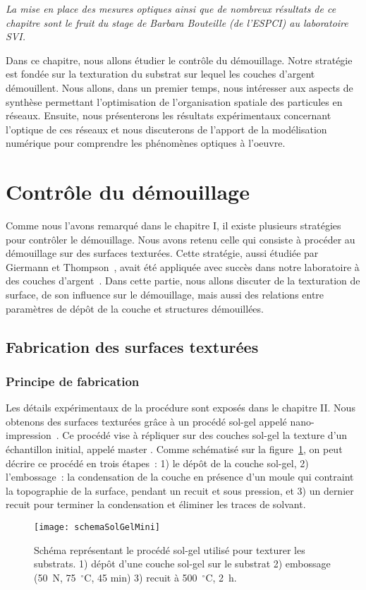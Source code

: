 \newpage\null\thispagestyle{empty}\newpage
\minitoc
\newpage

\textit{La mise en place des mesures optiques ainsi que de nombreux résultats de ce chapitre sont le fruit du stage de Barbara Bouteille (de l'ESPCI) au laboratoire SVI.}\par 
Dans ce chapitre, nous allons étudier le contrôle du démouillage. Notre stratégie est fondée sur la texturation du substrat sur lequel les couches d'argent démouillent. Nous allons, dans un premier temps, nous intéresser aux aspects de synthèse permettant l'optimisation de l'organisation spatiale des particules en réseaux. Ensuite, nous présenterons les résultats expérimentaux concernant l'optique de ces réseaux et nous discuterons de l'apport de la modélisation numérique pour comprendre les phénomènes optiques à l'oeuvre.

\section{Contrôle du démouillage}
Comme nous l'avons remarqué dans le chapitre I, il existe plusieurs stratégies pour contrôler le démouillage. Nous avons retenu celle qui consiste à procéder au démouillage sur des surfaces texturées. Cette stratégie, aussi étudiée par Giermann et Thompson~\cite{giermann2005solid, giermann2011requirements}, avait été appliquée avec succès dans notre laboratoire à des couches d'argent~\cite{le2014self}. Dans cette partie, nous allons discuter de la texturation de surface, de son influence sur le démouillage, mais aussi des relations entre paramètres de dépôt de la couche et structures démouillées.\par 

	\subsection{Fabrication des surfaces texturées}
	\subsubsection{Principe de fabrication}
Les détails expérimentaux de la procédure sont exposés dans le chapitre II. Nous obtenons des surfaces texturées grâce à un procédé sol-gel appelé nano-impression~\cite{le2014self,chou1996nanoimprint}. Ce procédé vise à répliquer sur des couches sol-gel la texture d'un échantillon initial, appelé \og master \fg. Comme schématisé sur la figure~\ref{schemaSolGelMini}, on peut décrire ce procédé en trois étapes~: 1) le dépôt de la couche sol-gel, 2) l'embossage~: la condensation de la couche en présence d'un moule qui contraint la topographie de la surface, pendant un recuit et sous pression, et 3) un dernier recuit pour terminer la condensation et éliminer les traces de solvant.
\begin{figure}[!htb]
\centering
\texttt{[image: schemaSolGelMini]}
\caption{Schéma représentant le procédé sol-gel utilisé pour texturer les substrats. 1) dépôt d'une couche sol-gel sur le substrat 2) embossage (50~N, 75~$^\circ$C, 45 min) 3) recuit à 500~$^\circ$C, 2~h.}
\label{schemaSolGelMini}
\end{figure}

